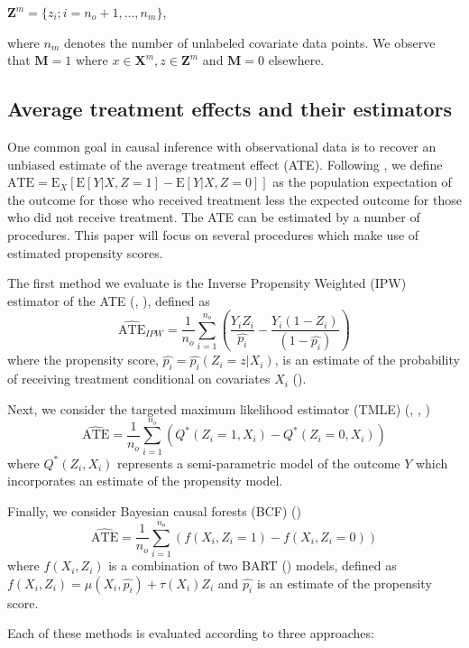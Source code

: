 \documentclass[aos]{imsart}
\newcommand{\X}{\mathbf{X}}
\newcommand{\M}{\mathbf{M}}
\newcommand{\Z}{\mathbf{Z}}
\newcommand{\E}{\mbox{E}}
\begin{document}
$\Z^m = \{z_i; i = n_o + 1, ... ,n_m \}$, 

where $n_m$ denotes the number of unlabeled covariate data points. We observe that $\M = 1$ where $x \in \X^m, z \in \Z^m$ and $\M = 0$ elsewhere.

\subsection{Average treatment effects and their estimators}

One common goal in causal inference with observational data is to recover an unbiased estimate of the average treatment effect (ATE). Following \cite{rosenbaum1983central}, 
we define $\textrm{ATE} = \E_X[\E[Y | X, Z = 1] - \E[Y | X, Z = 0]]$ as the population expectation of the outcome for those who received treatment less the expected outcome for those who did 
not receive treatment. The ATE can be estimated by a number of procedures. This paper will focus on several procedures which make use of estimated propensity scores.

The first method we evaluate is the Inverse Propensity Weighted (IPW) estimator of the ATE (\cite{hirano2003efficient}, \cite{cerulli2014treatrew}), defined as
\[ \widehat{\textrm{ATE}}_{IPW} = \frac{1}{n_o} \sum_{i = 1}^{n_o} \left( \frac{Y_i Z_i}{\hat{p_i}} - \frac{Y_i (1 - Z_i)}{(1 - \hat{p_i})} \right) \]
where the propensity score, $\hat{p_i} = \hat{p_i}(Z_i = z | X_i)$, is an estimate of the probability of receiving treatment conditional on covariates $X_i$ (\cite{rosenbaum1983central}).

Next, we consider the targeted maximum likelihood estimator (TMLE) (\cite{van2010targeted}, \cite{van2010targeted2}, \cite{gruber2009targeted})
\[\widehat{\textrm{ATE}} = \frac{1}{n_o} \sum_{i = 1}^{n_o} \left( Q^*\left( Z_i = 1, X_i \right) - Q^*\left( Z_i = 0, X_i \right) \right)\]
where $Q^*\left( Z_i, X_i \right)$ represents a semi-parametric model of the outcome $Y$ which incorporates an estimate of the propensity model.

Finally, we consider Bayesian causal forests (BCF) (\cite{hahn2017bayesian})
\[\widehat{\textrm{ATE}} = \frac{1}{n_o} \sum_{i = 1}^{n_o} \left( f(X_i, Z_i = 1) - f(X_i, Z_i = 0) \right) \]
where $f(X_i, Z_i)$ is a combination of two BART (\cite{chipman2010bart}) models, defined as $f(X_i, Z_i) = \mu(X_i, \hat{p_i}) + \tau(X_i) Z_i$ and $\hat{p_i}$ is an estimate of the propensity score.

Each of these methods is evaluated according to three approaches:
\end{document}
